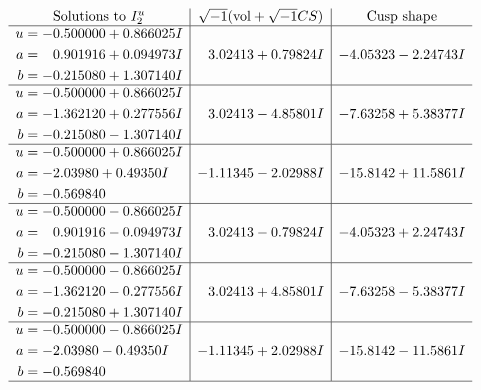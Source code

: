 \documentclass[1p]{elsarticle_modified}
\theoremstyle{definition}
\newcommand{\I}{\sqrt{-1}}
\begin{document}
$$\begin{array}{c|c|c}  
\text{Solutions to }I^u_{2}& \I (\text{vol} + \sqrt{-1}CS) & \text{Cusp shape}\\
 \hline 
\begin{aligned}
u &= -0.500000 + 0.866025 I \\
a &= \phantom{-}0.901916 + 0.094973 I \\
b &= -0.215080 + 1.307140 I\end{aligned}
 & \phantom{-}3.02413 + 0.79824 I & -4.05323 - 2.24743 I \\ \hline\begin{aligned}
u &= -0.500000 + 0.866025 I \\
a &= -1.362120 + 0.277556 I \\
b &= -0.215080 - 1.307140 I\end{aligned}
 & \phantom{-}3.02413 - 4.85801 I & -7.63258 + 5.38377 I \\ \hline\begin{aligned}
u &= -0.500000 + 0.866025 I \\
a &= -2.03980 + 0.49350 I \\
b &= -0.569840\phantom{ +0.000000I}\end{aligned}
 & -1.11345 - 2.02988 I & -15.8142 + 11.5861 I \\ \hline\begin{aligned}
u &= -0.500000 - 0.866025 I \\
a &= \phantom{-}0.901916 - 0.094973 I \\
b &= -0.215080 - 1.307140 I\end{aligned}
 & \phantom{-}3.02413 - 0.79824 I & -4.05323 + 2.24743 I \\ \hline\begin{aligned}
u &= -0.500000 - 0.866025 I \\
a &= -1.362120 - 0.277556 I \\
b &= -0.215080 + 1.307140 I\end{aligned}
 & \phantom{-}3.02413 + 4.85801 I & -7.63258 - 5.38377 I \\ \hline\begin{aligned}
u &= -0.500000 - 0.866025 I \\
a &= -2.03980 - 0.49350 I \\
b &= -0.569840\phantom{ +0.000000I}\end{aligned}
 & -1.11345 + 2.02988 I & -15.8142 - 11.5861 I\\
 \hline 
 \end{array}$$\newpage\newpage\renewcommand{\arraystretch}{1}
\end{document}
